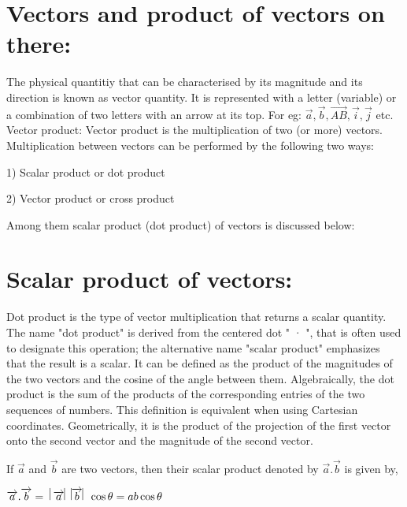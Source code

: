 \documentclass[11pt]{article}
\makeatletter
\def\@shorttitle{\@empty}
\def\shorttitle#1{\gdef\@shorttitle{#1}}
\makeatother
\begin{document}
\renewcommand*\rmdefault{bch}\normalfont\upshape




\shorttitle{}

\date{}  

\vspace{1cm}
\section{Vectors and product of vectors on there:}
The physical quantitiy that can be characterised by its magnitude and its direction is known as vector quantity. It is represented with a letter (variable) or a combination of two letters with an arrow at its top. For eg: $\overrightarrow{a},\overrightarrow{b}, \overrightarrow{AB},\overrightarrow{i},\overrightarrow{j}$ etc.\\
Vector product: Vector product is the multiplication of two (or more) vectors. Multiplication between vectors can be performed by the following two ways:


1) Scalar product or dot product


2) Vector product or cross product

Among them scalar product (dot product) of vectors is discussed below:



\section{Scalar product of vectors:}
Dot product is the type of vector multiplication that returns a scalar quantity. The name "dot product" is derived from the centered dot " · ", that is often used to designate this operation; the alternative name "scalar product" emphasizes that the result is a scalar. It can be defined as the product of the magnitudes of the two vectors and the cosine of the angle between them. Algebraically, the dot product is the sum of the products of the corresponding entries of the two sequences of numbers. This definition is equivalent when using Cartesian coordinates. Geometrically, it is the product of the projection of the first vector onto the second vector and the magnitude of the second vector.

 
If $\overrightarrow{a}$ and $\overrightarrow{b}$ are two vectors, then their scalar product denoted by $\overrightarrow{a}.\overrightarrow{b}$ is given by,

\begin{center}
$\overrightarrow{a}.\overrightarrow{b} =\hspace{0.2cm} \vline \overrightarrow{a} \vline \hspace{0.2cm} \vline \overrightarrow{b} \vline \hspace{0.2cm} \cos \theta = ab\cos\theta$
\end{center}
\end{document}
